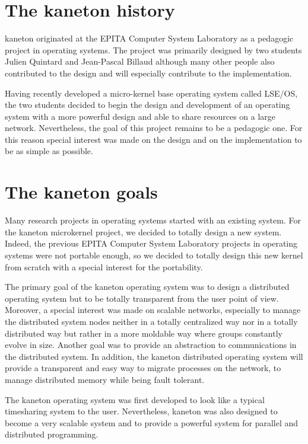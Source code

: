 \begin{multicols}{2}



\section{The kaneton history}

kaneton originated at the EPITA Computer System Laboratory as a pedagogic
project in operating systems. The project was primarily designed by two students
Julien Quintard and Jean-Pascal Billaud although many other people also
contributed to the design and will especially contribute to the implementation.

Having recently developed a micro-kernel base operating system called LSE/OS,
the two students decided to begin the design and development of an operating
system with a more powerful design and able to share resources on a large
network. Nevertheless, the goal of this project remains to be a pedagogic
one. For this reason special interest was made on the design and on the
implementation to be as simple as possible.




\section{The kaneton goals}

Many research projects in operating systems started with an existing system.
For the kaneton microkernel project, we decided to totally design a
new system. Indeed, the previous EPITA Computer System Laboratory projects in
operating systems were not portable enough, so we decided to totally design
this new kernel from scratch with a special interest for the portability.

The primary goal of the kaneton operating system was to design a distributed
operating system but to be totally transparent from the user point of view.
Moreover, a special interest was made on scalable networks, especially
to manage the distributed system nodes neither in a totally centralized way
nor in a totally distributed way but rather in a more moldable way where groups
constantly evolve in size. Another goal was to provide an abstraction to
communications in the distributed system. In addition, the kaneton distributed
operating system will provide a transparent and easy way to migrate processes
on the network, to manage distributed memory while being fault tolerant.

The kaneton operating system was first developed to look like a typical
timesharing system to the user. Nevertheless, kaneton was also designed to
become a very scalable system and to provide a powerful system for
parallel and distributed programming.




\end{multicols}
